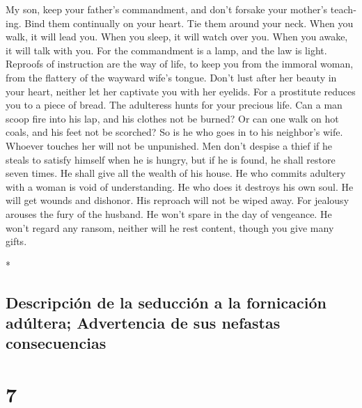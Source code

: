 \begin{paracol}{2}
\begin{otherlanguage}{english}
 My son, keep your father's commandment, and don't
forsake your mother's teaching.  Bind them continually on
your heart. Tie them around your neck.  When you walk, it
will lead you. When you sleep, it will watch over you. When you awake,
it will talk with you.  For the commandment is a lamp,
and the law is light. Reproofs of instruction are the way of life,
 to keep you from the immoral woman, from the flattery of
the wayward wife's tongue.  Don't lust after her beauty
in your heart, neither let her captivate you with her eyelids.
 For a prostitute reduces you to a piece of bread. The
adulteress hunts for your precious life.  Can a man scoop
fire into his lap, and his clothes not be burned?  Or can
one walk on hot coals, and his feet not be scorched?  So
is he who goes in to his neighbor's wife. Whoever touches her will not
be unpunished.  Men don't despise a thief if he steals to
satisfy himself when he is hungry,  but if he is found,
he shall restore seven times. He shall give all the wealth of his house.
 He who commits adultery with a woman is void of
understanding. He who does it destroys his own soul.  He
will get wounds and dishonor. His reproach will not be wiped away.
 For jealousy arouses the fury of the husband. He won't
spare in the day of vengeance.  He won't regard any
ransom, neither will he rest content, though you give many gifts.

\end{otherlanguage}

\switchcolumn[0]*

\hypertarget{descripciuxf3n-de-la-seducciuxf3n-a-la-fornicaciuxf3n-aduxfaltera-advertencia-de-sus-nefastas-consecuencias}{%
\subsection{Descripción de la seducción a la fornicación adúltera;
Advertencia de sus nefastas
consecuencias}\label{descripciuxf3n-de-la-seducciuxf3n-a-la-fornicaciuxf3n-aduxfaltera-advertencia-de-sus-nefastas-consecuencias}}

\hypertarget{section-12}{%
\section{7}\label{section-12}}


\end{paracol}
